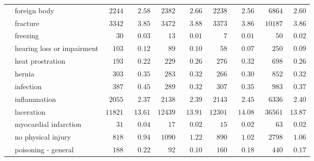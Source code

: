 \documentclass[9pt, oneside]{article}   	%
\begin{document}
\begin{longtable}{p{1.8in}p{2.2in}cccccccc}
 & foreign body  & $\phantom{0}2244$ & $\phantom{00}2.58$ & $\phantom{0}2382$ & $\phantom{00}2.66$ & $\phantom{0}2238$ & $\phantom{00}2.56$ & $\phantom{00}6864$ & $\phantom{0}2.60$ \\
 & fracture  & $\phantom{0}3342$ & $\phantom{00}3.85$ & $\phantom{0}3472$ & $\phantom{00}3.88$ & $\phantom{0}3373$ & $\phantom{00}3.86$ & $\phantom{0}10187$ & $\phantom{0}3.86$ \\
 & freezing  & $\phantom{000}30$ & $\phantom{00}0.03$ & $\phantom{000}13$ & $\phantom{00}0.01$ & $\phantom{0000}7$ & $\phantom{00}0.01$ & $\phantom{0000}50$ & $\phantom{0}0.02$ \\
 & hearing loss or impairment  & $\phantom{00}103$ & $\phantom{00}0.12$ & $\phantom{000}89$ & $\phantom{00}0.10$ & $\phantom{000}58$ & $\phantom{00}0.07$ & $\phantom{000}250$ & $\phantom{0}0.09$ \\
 & heat prostration  & $\phantom{00}193$ & $\phantom{00}0.22$ & $\phantom{00}229$ & $\phantom{00}0.26$ & $\phantom{00}276$ & $\phantom{00}0.32$ & $\phantom{000}698$ & $\phantom{0}0.26$ \\
 & hernia  & $\phantom{00}303$ & $\phantom{00}0.35$ & $\phantom{00}283$ & $\phantom{00}0.32$ & $\phantom{00}266$ & $\phantom{00}0.30$ & $\phantom{000}852$ & $\phantom{0}0.32$ \\
 & infection  & $\phantom{00}387$ & $\phantom{00}0.45$ & $\phantom{00}289$ & $\phantom{00}0.32$ & $\phantom{00}307$ & $\phantom{00}0.35$ & $\phantom{000}983$ & $\phantom{0}0.37$ \\
 & inflammation  & $\phantom{0}2055$ & $\phantom{00}2.37$ & $\phantom{0}2138$ & $\phantom{00}2.39$ & $\phantom{0}2143$ & $\phantom{00}2.45$ & $\phantom{00}6336$ & $\phantom{0}2.40$ \\
 & laceration  & $11821$ & $\phantom{0}13.61$ & $12439$ & $\phantom{0}13.91$ & $12301$ & $\phantom{0}14.08$ & $\phantom{0}36561$ & $13.87$ \\
 & myocardial infarction  & $\phantom{000}31$ & $\phantom{00}0.04$ & $\phantom{000}17$ & $\phantom{00}0.02$ & $\phantom{000}15$ & $\phantom{00}0.02$ & $\phantom{0000}63$ & $\phantom{0}0.02$ \\
 & no physical injury  & $\phantom{00}818$ & $\phantom{00}0.94$ & $\phantom{0}1090$ & $\phantom{00}1.22$ & $\phantom{00}890$ & $\phantom{00}1.02$ & $\phantom{00}2798$ & $\phantom{0}1.06$ \\
 & poisoning - general  & $\phantom{00}188$ & $\phantom{00}0.22$ & $\phantom{000}92$ & $\phantom{00}0.10$ & $\phantom{00}160$ & $\phantom{00}0.18$ & $\phantom{000}440$ & $\phantom{0}0.17$ \\

\end{longtable}
\end{document}
